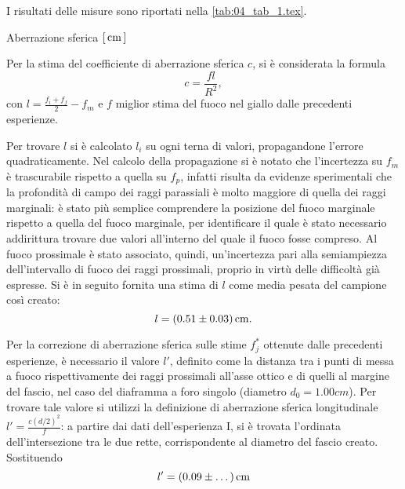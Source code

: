 
I risultati delle misure sono riportati nella \autoref{tab:04_tab_1.tex}.
\begin{tabella}
	\centering
	
	\caption{Aberrazione sferica $[\,\mathrm{cm}\,]$}
	\label{tab:04_tab_1.tex}
\end{tabella}

Per la stima del coefficiente di aberrazione sferica $c$, si \`e considerata la formula
\[ c=\frac{f   l}{R^2}, \] 
con \( l = \frac{f_i + f_f}{2} - f_m \) e $f$ miglior stima del fuoco nel giallo dalle precedenti esperienze.


Per trovare $l$ si \`e calcolato $l_i$ su ogni terna di valori, propagandone l'errore quadraticamente. Nel calcolo della propagazione si \`e notato che l'incertezza su $f_m$ è trascurabile rispetto a quella su $f_p$, infatti risulta da evidenze sperimentali che la profondità di campo dei raggi parassiali \`e molto maggiore di quella dei raggi marginali: è stato più semplice comprendere la posizione del fuoco marginale rispetto a quella del fuoco marginale, per identificare il quale è stato necessario addirittura trovare due valori all'interno del quale il fuoco fosse compreso. Al fuoco prossimale è stato associato, quindi, un'incertezza pari alla semiampiezza dell'intervallo di fuoco dei raggi prossimali, proprio in virt\`u delle difficolt\`a già espresse. Si \`e in seguito fornita una stima di $l$ come media pesata del campione cos\`i creato:
\[ l = (0.51 \pm 0.03) \,\mathrm{cm}. \]


Per la correzione di aberrazione sferica sulle stime $f^*_j$ ottenute dalle precedenti esperienze, \`e necessario il valore $ l'$, definito come la distanza tra i punti di messa a fuoco rispettivamente dei raggi prossimali all'asse ottico e di quelli al margine del fascio, nel caso del diaframma a foro singolo (diametro $d_0=1.00 cm$). Per trovare tale valore si utilizzi la definizione di aberrazione sferica longitudinale $l'=\frac{c(d/2)^2}{f}$: a partire dai dati dell'esperienza I, si \`e trovata l'ordinata dell'intersezione tra le due rette, corrispondente al diametro del fascio creato. Sostituendo 
\[ l' = (0.09 \pm \dots )\,\mathrm{cm} \] 


